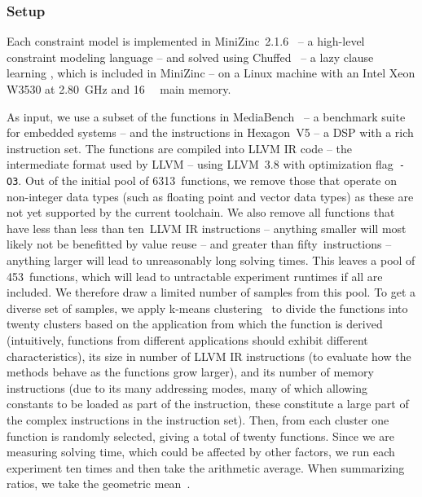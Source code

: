 \subsubsection{Setup}

Each \gls{constraint model} is implemented in \mbox{\gls{MiniZinc}
  2.1.6}~\cite{NethercoteEtAl:2007} -- a high-level \gls{constraint} modeling
language -- and solved using \gls{Chuffed}~\cite{Chu:2011} -- a \gls{lazy clause
  learning} , which is included in \gls{MiniZinc} --
on a Linux machine with an \gls{Intel} Xeon W3530 at \SI{2.80}{\GHz} and
\SI{16}{\giga\byte} main memory.

As input, we use a subset of the \glspl{function} in
\gls{MediaBench}~\cite{LeeEtAl:1997} -- a benchmark suite for embedded systems
-- and the \glspl{instruction} in \gls{Hexagon}~V5 -- a \gls{DSP} with a rich
\gls{instruction set}.
%
The \glspl{function} are compiled into \gls{LLVM} \gls{IR} code -- the
intermediate format used by \gls{LLVM} -- using \mbox{\gls{LLVM} 3.8} with
optimization flag~\texttt{-O3}.
%
Out of the initial pool of \num{6313}~\glspl{function}, we remove those that
operate on non-integer data types (such as floating point and vector data types)
as these are not yet supported by the current toolchain.
%
We also remove all \glspl{function} that have less than less than ten~\gls{LLVM}
\gls{IR} \glspl{instruction} -- anything smaller will most likely not be
benefitted by \gls{value reuse} -- and greater than fifty~\glspl{instruction} --
anything larger will lead to unreasonably long solving times.
%
This leaves a pool of \num{453}~\glspl{function}, which will lead to untractable
experiment runtimes if all are included.
%
We therefore draw a limited number of samples from this pool.
%
To get a diverse set of samples, we apply \gls{k-means
  clustering}~\cite{PhansalkarEtAl:2005} to divide the \glspl{function} into
twenty clusters based on the application from which the \gls{function} is
derived (intuitively, \glspl{function} from different applications should
exhibit different characteristics), its size in number of \gls{LLVM} \gls{IR}
\glspl{instruction} (to evaluate how the methods behave as the \glspl{function}
grow larger), and its number of memory \glspl{instruction} (due to its many
addressing modes, many of which allowing constants to be loaded as part of the
\gls{instruction}, these constitute a large part of the complex
\glspl{instruction} in the \gls{instruction set}).
%
Then, from each cluster one \gls{function} is randomly selected, giving a total
of twenty \glspl{function}.
%
Since we are measuring solving time, which could be affected by other factors,
we run each experiment ten times and then take the arithmetic average.
%
When summarizing ratios, we take the geometric mean~\cite{FlemingWallace:1986}.


